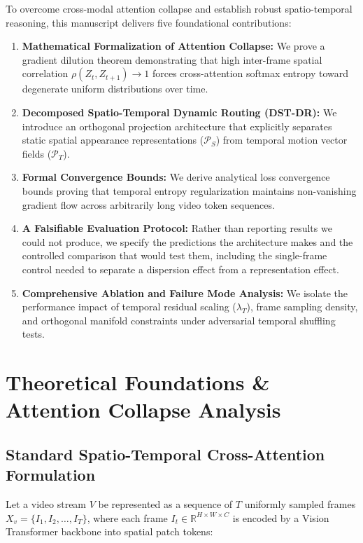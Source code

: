 \documentclass{article}
\begin{document}
To overcome cross-modal attention collapse and establish robust spatio-temporal reasoning, this manuscript delivers five foundational contributions:
\begin{enumerate}
  \item \textbf{Mathematical Formalization of Attention Collapse:} We prove a gradient dilution theorem demonstrating that high inter-frame spatial correlation $\rho(Z_t, Z_{t+1}) \to 1$ forces cross-attention softmax entropy toward degenerate uniform distributions over time.
  \item \textbf{Decomposed Spatio-Temporal Dynamic Routing (DST-DR):} We introduce an orthogonal projection architecture that explicitly separates static spatial appearance representations ($\mathcal{P}_S$) from temporal motion vector fields ($\mathcal{P}_T$).
  \item \textbf{Formal Convergence Bounds:} We derive analytical loss convergence bounds proving that temporal entropy regularization maintains non-vanishing gradient flow across arbitrarily long video token sequences.
  \item \textbf{A Falsifiable Evaluation Protocol:} Rather than reporting results we could not produce, we specify the predictions the architecture makes and the controlled comparison that would test them, including the single-frame control needed to separate a dispersion effect from a representation effect.
  \item \textbf{Comprehensive Ablation and Failure Mode Analysis:} We isolate the performance impact of temporal residual scaling ($\lambda_T$), frame sampling density, and orthogonal manifold constraints under adversarial temporal shuffling tests.
\end{enumerate}




\section{Theoretical Foundations \& Attention Collapse Analysis}



\subsection{Standard Spatio-Temporal Cross-Attention Formulation}


Let a video stream $V$ be represented as a sequence of $T$ uniformly sampled frames $X_v = \{I_1, I_2, \ldots, I_T\}$, where each frame $I_t \in \mathbb{R}^{H \times W \times C}$ is encoded by a Vision Transformer backbone into spatial patch tokens:
\end{document}

